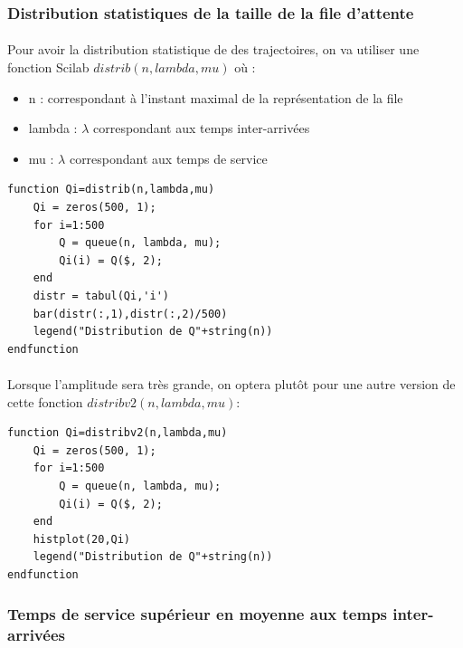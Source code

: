 \documentclass{article}
\begin{document}
\subsubsection{Distribution statistiques de la taille de la file d'attente}
\paragraph{}
Pour avoir la distribution statistique de des trajectoires, on va utiliser une fonction Scilab $distrib(n,lambda,mu)$ où :
\begin{itemize}
	\item n : correspondant à l'instant maximal de la représentation de la file
	\item lambda : $\lambda$ correspondant aux temps inter-arrivées
	\item mu :  $\lambda$ correspondant aux temps de service
\end{itemize}
\begin{verbatim}
function Qi=distrib(n,lambda,mu)
	Qi = zeros(500, 1);
	for i=1:500
		Q = queue(n, lambda, mu);
		Qi(i) = Q($, 2);
	end
	distr = tabul(Qi,'i')
	bar(distr(:,1),distr(:,2)/500)
	legend("Distribution de Q"+string(n))
endfunction
\end{verbatim}
\paragraph{}
Lorsque l'amplitude sera très grande, on optera plutôt pour une autre version de cette fonction $distribv2(n,lambda,mu)$: 
\begin{verbatim}
function Qi=distribv2(n,lambda,mu)
	Qi = zeros(500, 1);
	for i=1:500
		Q = queue(n, lambda, mu);
		Qi(i) = Q($, 2);
	end
	histplot(20,Qi)
	legend("Distribution de Q"+string(n))
endfunction
\end{verbatim}

\subsubsection{Temps de service supérieur en moyenne aux temps inter-arrivées}
\end{document}
